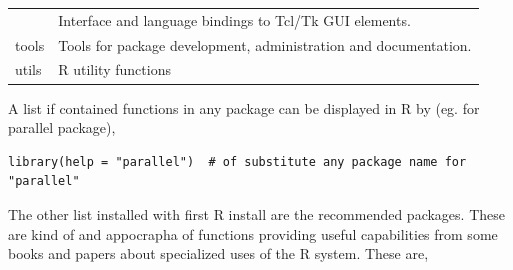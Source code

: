\documentclass[]{book}
\theoremstyle{definition}
\theoremstyle{definition}
\theoremstyle{definition}
\theoremstyle{remark}
\begin{document}
\begin{longtable}[]{@{}ll@{}}
\begin{minipage}[t]{0.13\columnwidth}
\end{minipage} & \begin{minipage}[t]{0.81\columnwidth}\raggedright\strut
Interface and language bindings to Tcl/Tk GUI elements.\strut
\end{minipage}\tabularnewline
\begin{minipage}[t]{0.13\columnwidth}\raggedright\strut
tools\strut
\end{minipage} & \begin{minipage}[t]{0.81\columnwidth}\raggedright\strut
Tools for package development, administration and documentation.\strut
\end{minipage}\tabularnewline
\begin{minipage}[t]{0.13\columnwidth}\raggedright\strut
utils\strut
\end{minipage} & \begin{minipage}[t]{0.81\columnwidth}\raggedright\strut
R utility functions\strut
\end{minipage}\tabularnewline
\bottomrule
\end{longtable}

A list if contained functions in any package can be displayed in R by
(eg. for parallel package),

\begin{verbatim}
library(help = "parallel")  # of substitute any package name for "parallel"
\end{verbatim}

The other list installed with first R install are the recommended
packages. These are kind of and appocrapha of functions providing useful
capabilities from some books and papers about specialized uses of the R
system. These are,
\end{document}
